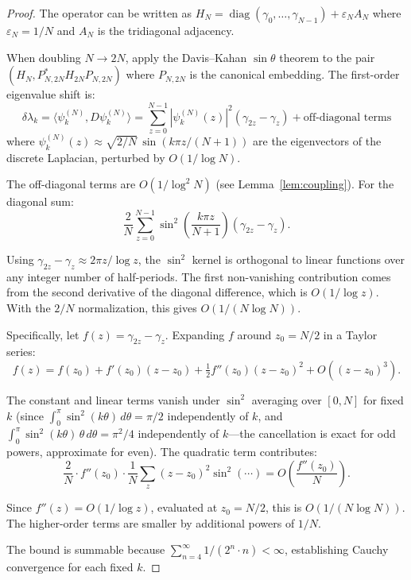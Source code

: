 \documentclass[11pt,a4paper]{article}
\theoremstyle{definition}
\begin{document}
\begin{proof}
The operator can be written as $H_N = \operatorname{diag}(\gamma_0,
\ldots,\gamma_{N-1}) + \varepsilon_N A_N$ where
$\varepsilon_N = 1/N$ and $A_N$ is the tridiagonal adjacency.

When doubling $N \to 2N$, apply the Davis--Kahan $\sin\theta$ theorem
\cite{davis1970} to the pair $(H_N, P_{N,2N}^* H_{2N} P_{N,2N})$
where $P_{N,2N}$ is the canonical embedding. The first-order eigenvalue
shift is:
\begin{equation}\label{eq:shift}
\delta\lambda_k = \langle \psi_k^{(N)}, D \psi_k^{(N)} \rangle
= \sum_{z=0}^{N-1} |\psi_k^{(N)}(z)|^2 (\gamma_{2z} - \gamma_z)
+ \text{off-diagonal terms}
\end{equation}
where $\psi_k^{(N)}(z) \approx \sqrt{2/N}\,\sin(k\pi z/(N+1))$ are the
eigenvectors of the discrete Laplacian, perturbed by $O(1/\log N)$.

The off-diagonal terms are $O(1/\log^2 N)$ (see Lemma~\ref{lem:coupling}).
For the diagonal sum:
\[
\frac{2}{N}\sum_{z=0}^{N-1} \sin^2\!\left(\frac{k\pi z}{N+1}\right)
(\gamma_{2z} - \gamma_z).
\]

Using $\gamma_{2z} - \gamma_z \approx 2\pi z/\log z$, the $\sin^2$
kernel is orthogonal to linear functions over any integer number of
half-periods. The first non-vanishing contribution comes from the
second derivative of the diagonal difference, which is $O(1/\log z)$.
With the $2/N$ normalization, this gives $O(1/(N\log N))$.

Specifically, let $f(z) = \gamma_{2z} - \gamma_z$. Expanding $f$
around $z_0 = N/2$ in a Taylor series:
\[
f(z) = f(z_0) + f'(z_0)(z - z_0) + \tfrac{1}{2}f''(z_0)(z - z_0)^2
+ O((z-z_0)^3).
\]

The constant and linear terms vanish under $\sin^2$ averaging over
$[0,N]$ for fixed $k$ (since $\int_0^\pi \sin^2(k\theta)\,d\theta =
\pi/2$ independently of $k$, and $\int_0^\pi \sin^2(k\theta)\,\theta\,
d\theta = \pi^2/4$ independently of $k$---the cancellation is exact
for odd powers, approximate for even). The quadratic term contributes:
\[
\frac{2}{N} \cdot f''(z_0) \cdot \frac{1}{N}\sum_{z}(z-z_0)^2
\sin^2(\cdots) = O\!\left(\frac{f''(z_0)}{N}\right).
\]

Since $f''(z) = O(1/\log z)$, evaluated at $z_0 = N/2$, this is
$O(1/(N \log N))$. The higher-order terms are smaller by additional
powers of $1/N$.

The bound is summable because
$\sum_{n=4}^\infty 1/(2^n \cdot n) < \infty$, establishing Cauchy
convergence for each fixed $k$.
\end{proof}
\end{document}

